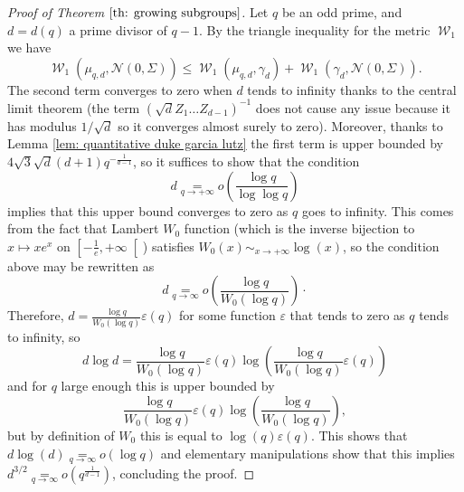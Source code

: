 \documentclass[12pt]{amsart}
\renewcommand{\mathcal}{\mathscr}
\DeclareMathOperator{\wass}{\mathcal{W}}
\theoremstyle{plain}
\theoremstyle{remark}
\theoremstyle{definition}
\newcommand{\mcN}{\mathcal{N}}
\begin{document}
\begin{proof}[Proof of Theorem $\ref{th: growing subgroups}$]
  Let $q$ be an odd prime, and $d = d(q)$ a prime divisor of
  $q-1$. By the triangle inequality for the metric $\wass_1$ we have
  $$
  \wass_1(\mu_{q,d}, \mcN(0, \Sigma)) \leqslant \wass_1(\mu_{q,d},
  \gamma_d) + \wass_1(\gamma_d, \mcN(0, \Sigma)).
  $$
  The second term converges to zero when $d$ tends to infinity thanks
  to the central limit theorem (the term
  $(\sqrt{d}Z_1 \dots Z_{d-1})^{-1}$ does not cause any issue because
  it has modulus $1/ \sqrt{d}$ so it converges almost surely to
  zero). Moreover, thanks to Lemma \ref{lem: quantitative duke garcia
    lutz} the first term is upper bounded by
  $ 4\sqrt{3} \sqrt{d} (d+1) q^{-\frac{1}{d-1}}$, so it suffices to
  show that the condition
  $$
  d \underset{q \to +\infty}{=} o \left( \frac{\log q}{\log \log
      q}\right)
  $$
  implies that this upper bound converges to zero as $q$ goes to
  infinity. This comes from the fact that Lambert $W_0$ function
  (which is the inverse bijection to $x \mapsto xe^x$ on
  $\left[- \frac{1}{e}, + \infty\right[$) satisfies
  $W_0(x) \sim_{x \to +\infty} \log(x)$, so the condition above may be
  rewritten as
  $$
  d  \underset{q \to \infty}{=} o \left( \frac{\log q}{W_0(\log q)}\right) \cdot
  $$
  Therefore, $d = \frac{\log q}{W_0(\log q)} \varepsilon(q)$ for some function $\varepsilon$ that tends to zero as $q$ tends to infinity, so
  $$
  d \log d = \frac{\log q}{W_0(\log q)} \varepsilon(q)
  \log\left(\frac{\log q}{W_0(\log q)} \varepsilon(q)\right)$$ and for
  $q$ large enough this is upper bounded by
  $$
  \frac{\log q}{W_0(\log q)} \varepsilon(q) \log\left(\frac{\log q}{W_0(\log q)} \right),
  $$
  but by definition of $W_0$ this is equal to
  $\log(q) \varepsilon(q)$. This shows that
  $d \log(d) \underset{q \to \infty}{=} o(\log q)$ and elementary
  manipulations show that this implies
  $d^{3/2} \underset{q \to \infty}{=} o
  \left(q^{\frac{1}{d-1}}\right)$, concluding the proof.
\end{proof}
\end{document}
